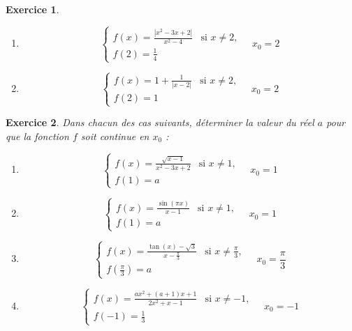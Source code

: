 \documentclass[12pt,a4paper]{article}
\theoremstyle{mystyle}
\newtheorem{exo}{Exercice}
\begin{document}
\begin{multicols*}{2}
\begin{exo}
\begin{enumerate}
    \item
    \[
    \begin{cases} 
        f(x) =\displaystyle\frac{|x^2 - 3x + 2|}{x^2 - 4} & \text{si } x \neq 2, \\
        f(2) =\displaystyle\frac{1}{4}
    \end{cases}
    \quad x_0 = 2
    \]

    \item
    \[
    \begin{cases} 
       f(x) = 1 + \displaystyle\frac{1}{|x - 2|} & \text{si } x \neq 2, \\
       f(2) = 1
    \end{cases}
    \quad x_0 = 2
    \]
\end{enumerate}
\end{exo}

\begin{exo}
     Dans chacun des cas suivants, déterminer la
valeur du réel $a$ pour que la fonction $f$ soit continue en $x_0$ :
\begin{enumerate}
    \item 
    \[
    \begin{cases} 
        f(x) =\displaystyle\frac{\sqrt{x - 1}}{x^2 - 3x + 2} & \text{si } x \neq 1, \\
        f(1) =a
    \end{cases}
    \quad x_0 = 1
    \]

    \item 
    \[
    \begin{cases} 
        f(x) =\displaystyle\frac{\sin(\pi x)}{x - 1} & \text{si } x \neq 1, \\
        f(1) =a
    \end{cases}
    \quad x_0 = 1
    \]

    \item 
    \[
    \begin{cases} 
        f(x) =\displaystyle\frac{\tan(x) - \sqrt{3}}{x - \displaystyle\frac{\pi}{3}} & \text{si } x \neq \displaystyle\frac{\pi}{3}, \\
        f\left(\displaystyle\frac{\pi}{3}\right) =a
    \end{cases}
    \quad x_0 = \displaystyle\frac{\pi}{3}
    \]

    \item 
    \[
    \begin{cases} 
        f(x) =\displaystyle\frac{a x^2 + (a + 1)x + 1}{2x^2 + x - 1} & \text{si } x \neq -1, \\
        f(-1) =\displaystyle\frac{1}{3}
    \end{cases}
    \quad x_0 = -1
    \]
\end{enumerate}


\end{exo}
\end{multicols*}
\end{document}

